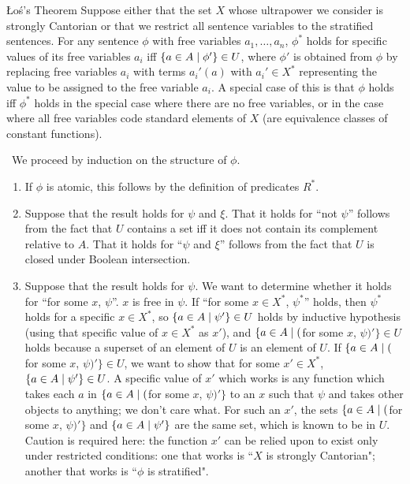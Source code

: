 \begin{Thm}{\L o\'s's Theorem} Suppose either that the set
$X$ whose ultrapower we consider is strongly Cantorian or that we
restrict all sentence variables to the stratified
sentences.  For any sentence $\phi$ with free variables $a_1,\ldots,a_n$,
$\phi^*$ holds for specific values of its free variables $a_i$ iff $\{a \in A
\mid \phi'\}\in U$, where $\phi'$ is obtained from $\phi$ by replacing free
variables $a_i$ with terms $a_i'(a)$ with $a_i' \in X^*$ representing
the value to be assigned to the free variable $a_i$.  A special case
of this is that $\phi$ holds iff $\phi^*$ holds in the special case
where there are no free variables, or in the case where all free
variables code standard elements of $X$ (are equivalence
classes of 
constant functions).
\end{Thm}

\preuve\ We proceed by induction on the structure
of $\phi$.
\begin{enumerate}
 \item If $\phi$ is atomic, this follows by the definition of
   predicates $R^*$.
 \item Suppose that the result holds for $\psi$ and $\xi$.  That it
   holds for ``not $\psi$'' follows from the fact that $U$ contains a set
   iff it does not contain its complement relative to $A$.
   That it holds for ``$\psi$ and $\xi$'' follows from the fact that $U$ is
   closed under Boolean
   intersection.
 \item Suppose that the result holds for $\psi$.  We want to determine
   whether it holds for ``for some $x$, $\psi$''.  $x$ is free in $\psi$.
   If ``for some $x \in X^*$, $\psi^*$'' holds, then $\psi^*$ holds for a
   specific $x \in X^*$, so $\{a \in A \mid \psi'\}\in U$ holds by
   inductive hypothesis (using that specific value of $x \in X^*$ as
   $x'$), and $\{a \in A \mid ($for some $x$, $\psi)'\}\in U$ holds
   because a superset of an element of $U$ is an element of $U$. If $\{a
   \in A \mid ($for some $x$, $\psi)'\}\in U$, we want to show that for
   some $x' \in X^*$, $\{a \in A \mid \psi'\} \in U$.  A specific value
   of $x'$ which works is any function which takes each $a$ in
   $\{a \in A \mid ($for some $x$, $\psi)'\}$ to an $x$ such that $\psi$ and
   takes other objects to anything; we don't care what.  For such an $x'$, the
   sets $\{a \in A \mid ($for some $x$, $\psi)'\}$ and $\{a \in A \mid
   \psi'\}$ are the same set, which is known to be in $U$.  Caution is
   required here: the function $x'$ can be relied upon to exist only
   under restricted conditions: one that works is ``$X$ is strongly
   Cantorian"; another that works is ``$\phi$ is
   stratified".\finpreuve
 \end{enumerate}

